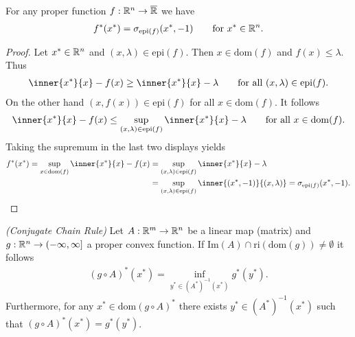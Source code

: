 \begin{lemma}
  For any proper function
  $
    f:\mathbb{R}^n\to\overline{\mathbb{R}}
  $
  we have
  \begin{gather}
    f^*(x^*) 
    =
    \sigma_{\mathrm{epi}(f)}
    (x^*,-1)
    \qquad
    \text{for}
    \ 
    x^* \in \R^n.
  \end{gather}
\end{lemma}
\begin{proof}
  Let $x^*\in\mathbb{R}^n$
  and
  $
    (x,\lambda)\in \mathrm{epi}(f).
  $
  Then
  $
    x \in \mathrm{dom}(f)
  $
  and
  $
    f(x)\le \lambda.
  $
  Thus
  \begin{gather}
    \inner{x^*}{x} - f(x)
    \ge
    \inner{x^*}{x} - \lambda
    \qquad
    \text{for all}\ 
    (x,\lambda)\in \mathrm{epi}(f).
  \end{gather}
  On the other hand 
  $
    (x,f(x))\in \mathrm{epi}(f)
  $
  for all
  $
    x \in \mathrm{dom}(f).
  $
  It follows
  \begin{gather}
    \inner{x^*}{x} - f(x)
    \le
    \sup_{(x,\lambda)\in\mathrm{epi}(f)}
    \inner{x^*}{x} - \lambda
    \qquad
    \text{for all}\ 
    x \in \mathrm{dom}(f).
  \end{gather}
  Taking the supremum in the last two displays yields
  \begin{align}
    f^*(x^*)
    =
    \sup_{x\in\mathrm{dom}(f)}
    \inner{x^*}{x} - f(x)
    &=
    \sup_{(x,\lambda)\in\mathrm{epi}(f)}
    \inner{x^*}{x} - \lambda
    \\
    &=
    \sup_{(x,\lambda)\in\mathrm{epi}(f)}
    \inner{(x^*,-1)}{(x,\lambda)} 
    =
    \sigma_{\mathrm{epi}(f)}
    (x^*,-1).
  \end{align}
\end{proof}
\begin{theorem}
  \emph{(Conjugate Chain Rule)}
  \label{cvxa_conjugate_chain_rule}
  Let 
  $
    A:
      \mathbb{R}^m \to \mathbb{R}^n
  $
  be a linear map (matrix)
  and
  $
    g:
      \mathbb{R}^n \to (-\infty, \infty]
  $
  a proper convex function. If
  $
    \text{Im}(A) \cap \text{ri}(\text{dom}(g))
    \neq
    \emptyset
  $
  it follows
  \begin{gather}
    ( g \circ A )^* ( x^* )
    =
    \inf_
          { y^* \in ( A^* )^{ -1 } ( x^* )}
                                          g^*( y^* )
                                          .
  \end{gather}
  Furthermore, 
    for any 
      $
        x^* \in \text{dom}( g \circ A)^*
      $
        there exists
          $
            y^* \in ( A^* )^{ -1 } ( x^* )
          $
            such that
              $
                ( g \circ A)^* ( x^* )
                =
                g^*( y^* )
              $.
\end{theorem}

